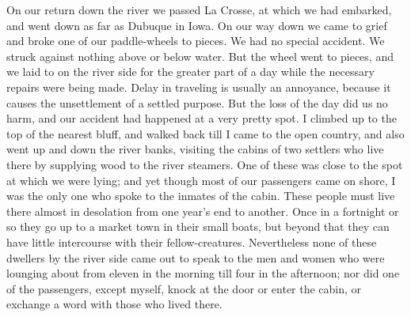 On our return down the river we passed La Crosse, at which we had
embarked, and went down as far as Dubuque in Iowa.  On our way down
we came to grief and broke one of our paddle-wheels to pieces.  We
had no special accident.  We struck against nothing above or below
water.  But the wheel went to pieces, and we laid to on the river
side for the greater part of a day while the necessary repairs were
being made.  Delay in traveling is usually an annoyance, because it
causes the unsettlement of a settled purpose.  But the loss of the
day did us no harm, and our accident had happened at a very pretty
spot.  I climbed up to the top of the nearest bluff, and walked
back till I came to the open country, and also went up and down the
river banks, visiting the cabins of two settlers who live there by
supplying wood to the river steamers.  One of these was close to
the spot at which we were lying; and yet though most of our
passengers came on shore, I was the only one who spoke to the
inmates of the cabin.  These people must live there almost in
desolation from one year's end to another.  Once in a fortnight or
so they go up to a market town in their small boats, but beyond
that they can have little intercourse with their fellow-creatures.
Nevertheless none of these dwellers by the river side came out to
speak to the men and women who were lounging about from eleven in
the morning till four in the afternoon; nor did one of the
passengers, except myself, knock at the door or enter the cabin, or
exchange a word with those who lived there.

